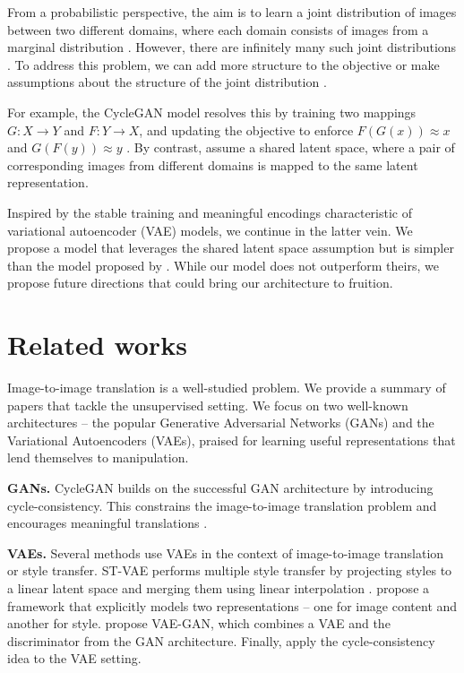 \documentclass{article}
\begin{document}
From a probabilistic perspective, the aim is to learn a joint distribution of images between two different domains, where each domain consists of images from a marginal distribution \citep{liu}. However, there are infinitely many such joint distributions \citep{liu}. To address this problem, we can add more structure to the objective \citep{zhu} or make assumptions about the structure of the joint distribution \citep{liu}.

For example, the CycleGAN model resolves this by training two mappings $G: X \rightarrow Y$ and $F: Y \rightarrow X$, and updating the objective to enforce $F(G(x)) \approx x$ and $G(F(y)) \approx y$ \citep{zhu}. By contrast, \citet{liu} assume a shared latent space, where a pair of corresponding images from different domains is mapped to the same latent representation.

Inspired by the stable training and meaningful encodings characteristic of variational autoencoder (VAE) models, we continue in the latter vein. We propose a model that leverages the shared latent space assumption but is simpler than the model proposed by \citet{liu}. While our model does not outperform theirs, we propose future directions that could bring our architecture to fruition.

\section{Related works}
 Image-to-image translation is a well-studied problem. We provide a summary of papers that tackle the unsupervised setting. We focus on two well-known architectures – the popular Generative Adversarial Networks (GANs) and the Variational Autoencoders (VAEs), praised for learning useful representations that lend themselves to manipulation.

\textbf{GANs.} CycleGAN builds on the successful GAN architecture by introducing cycle-consistency. This constrains the image-to-image translation problem and encourages meaningful translations \citep{zhu}.

\textbf{VAEs.} Several methods use VAEs in the context of image-to-image translation or style transfer. ST-VAE performs multiple style transfer by projecting styles to a linear latent space and merging them using linear interpolation \citep{liu2}. \citet{kazemi} propose a framework that explicitly models two representations – one for image content and another for style. \citet{larsen} propose VAE-GAN, which combines a VAE and the discriminator from the GAN architecture. Finally, \citet{jha} apply the cycle-consistency idea to the VAE setting.
\end{document}
